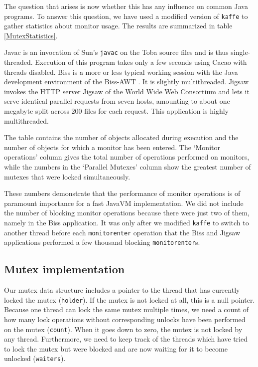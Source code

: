 The question that arises is now whether this has any influence on
common Java programs. To answer this question, we have used a modified
version of \texttt{kaffe} to gather statistics about monitor usage.
The results are summarized in table \ref{MutexStatistics}.

Javac is an invocation of Sun's \texttt{javac} on the Toba source
files \cite{Proebsting+97} and is thus single-threaded. Execution of
this program takes only a few seconds using Cacao with threads
disabled. Biss is a more or less typical working session with the Java
development environment of the Biss-AWT \cite{BissAWT97}. It is
slightly multithreaded. Jigsaw invokes the HTTP server Jigsaw
\cite{Jigsaw97} of the World Wide Web Consortium and lets it serve
identical parallel requests from seven hosts, amounting to about one
megabyte split across 200 files for each request. This application is
highly multithreaded.

The table contains the number of objects allocated during execution
and the number of objects for which a monitor has been entered. The
`Monitor operations' column gives the total number of operations
performed on monitors, while the numbers in the `Parallel Mutexes'
column show the greatest number of mutexes that were locked
simultaneously.

These numbers demonstrate that the performance of monitor operations
is of paramount importance for a fast JavaVM implementation. We did
not include the number of blocking monitor operations because there
were just two of them, namely in the Biss application. It was only
after we modified \texttt{kaffe} to switch to another thread before
each \texttt{monitorenter} operation that the Biss and Jigsaw
applications performed a few thousand blocking \texttt{monitorenter}s.


\subsection{Mutex implementation}

Our mutex data structure includes a pointer to the thread that has
currently locked the mutex (\texttt{holder}). If the mutex is not
locked at all, this is a null pointer. Because one thread can lock the
same mutex multiple times, we need a count of how many lock operations
without corresponding unlocks have been performed on the mutex
(\texttt{count}). When it goes down to zero, the mutex is not locked
by any thread. Furthermore, we need to keep track of the threads which
have tried to lock the mutex but were blocked and are now waiting for
it to become unlocked (\texttt{waiters}). 

